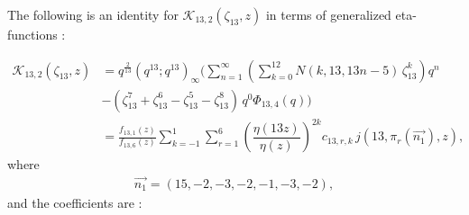 \documentclass[12pt]{amsart}
\theoremstyle{definition}
\theoremstyle{remark}
\numberwithin{equation}{section}
\newcommand\Lpar[1]{\left(#1\right)}
\begin{document}
The following is an identity for $\mathcal{K}_{13,2}(\zeta_{13},z)$ in terms of generalized eta-functions : 

\begin{align}
\mathcal{K}_{13,2}(\zeta_{13},z)&=q^\frac{2}{13}(q^{13};q^{13})_\infty \Bigg(\sum_{n=1}^\infty \Lpar{\sum_{k=0}^{12} N(k,13,13n-5)\,\zeta_{13}^k}q^n \label{eq:rank13id2} \\
&-(\zeta_{13}^{7}+\zeta_{13}^{6}-\zeta_{13}^5-\zeta_{13}^8)\,q^{0} \Phi_{13,4}(q)\Bigg)
\nonumber
\\
&=\frac{f_{13,1}(z)}{f_{13,6}(z)}\sum_{k=-1}^{1}\sum_{r=1}^{6} \left(\dfrac{\eta(13z)}{\eta(z)}\right)^{2k}c_{13,r,k}\,j(13,\pi_r(\overrightarrow{n_1}),z),
\nonumber
\end{align}
where 
\begin{align*}
\overrightarrow{n_1}=(15,-2,-3,-2,-1,-3,-2),
\end{align*}
and the coefficients are :
\end{document}
